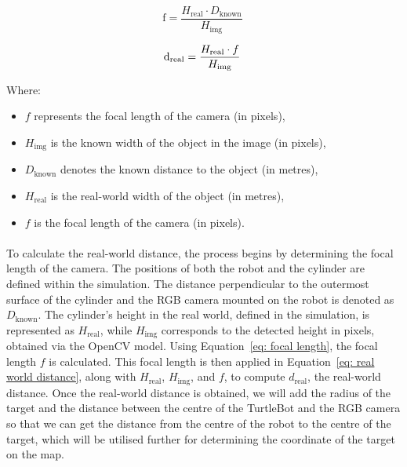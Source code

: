 \begin{equation}
\text{f} = \frac{H_{\text{real}}\cdot D_{\text{known}}}{H_{\text{img}}}\
\label{eq: focal length}
\end{equation}

\begin{equation}
\text d_{\text{real}} = \frac{H_{\text{real}}\cdot f}{H_{\text{img}}}\
\label{eq: real world distance}
\end{equation}

Where:
\begin{itemize}
    \item \( f \) represents the focal length of the camera (in pixels),
    \item \( H_{\text{img}} \) is the known width of the object in the image (in pixels),
    \item \( D_{\text{known}} \) denotes the known distance to the object (in metres),
    \item \( H_{\text{real}} \) is the real-world width of the object (in metres),
    \item \( f \) is the focal length of the camera (in pixels).
\end{itemize}

\paragraph*{}
To calculate the real-world distance, the process begins by determining the focal length of the camera. The positions of both the robot and the cylinder are defined within the simulation. The distance perpendicular to the outermost surface of the cylinder and the RGB camera mounted on the robot is denoted as \(D_{\text{known}}\). The cylinder's height in the real world, defined in the simulation, is represented as \(H_{\text{real}}\), while \(H_{\text{img}}\) corresponds to the detected height in pixels, obtained via the OpenCV model. Using Equation~\ref{eq: focal length}, the focal length \(f\) is calculated. This focal length is then applied in Equation~\ref{eq: real world distance}, along with \(H_{\text{real}}\), \(H_{\text{img}}\), and \(f\), to compute \(d_{\text{real}}\), the real-world distance. Once the real-world distance is obtained, we will add the radius of the target and the distance between the centre of the TurtleBot and the RGB camera so that we can get the distance from the centre of the robot to the centre of the target, which will be utilised further for determining the coordinate of the target on the map.

